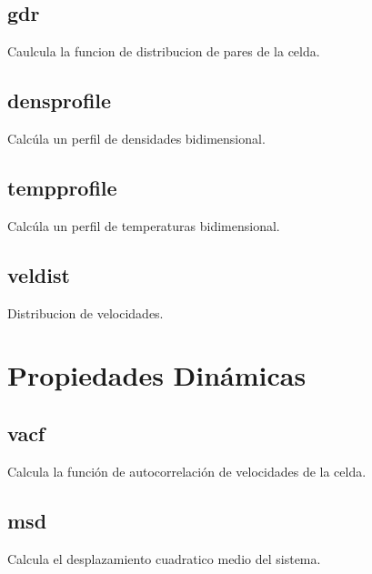\subsection{gdr}
Caulcula la funcion de distribucion de pares de la celda.
\subsection{densprofile}
Calc\'ula un perfil de densidades bidimensional.
\subsection{tempprofile}
Calc\'ula un perfil de temperaturas bidimensional.
\subsection{veldist}
Distribucion de velocidades.

\section{Propiedades Din\'amicas}
\subsection{vacf}
Calcula la funci\'on de autocorrelaci\'on de velocidades de la celda.
\subsection{msd}
Calcula el desplazamiento cuadratico medio del sistema.
